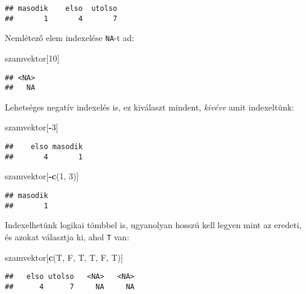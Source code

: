 \documentclass[]{book}
\newenvironment{Shaded}{\begin{snugshade}}{\end{snugshade}}
\newcommand{\DecValTok}[1]{\textcolor[rgb]{0.00,0.00,0.81}{#1}}
\newcommand{\KeywordTok}[1]{\textcolor[rgb]{0.13,0.29,0.53}{\textbf{#1}}}
\newcommand{\NormalTok}[1]{#1}
\newcommand{\OperatorTok}[1]{\textcolor[rgb]{0.81,0.36,0.00}{\textbf{#1}}}
\begin{document}
\begin{verbatim}
## masodik    elso  utolso 
##       1       4       7
\end{verbatim}

Nemlétező elem indexelése \texttt{NA}-t ad:

\begin{Shaded}
\begin{Highlighting}[]
\NormalTok{szamvektor[}\DecValTok{10}\NormalTok{]}
\end{Highlighting}
\end{Shaded}

\begin{verbatim}
## <NA> 
##   NA
\end{verbatim}

Lehetséges negatív indexelés is, ez kiválaszt mindent, \emph{kivéve} amit indexeltünk:

\begin{Shaded}
\begin{Highlighting}[]
\NormalTok{szamvektor[}\OperatorTok{-}\DecValTok{3}\NormalTok{]}
\end{Highlighting}
\end{Shaded}

\begin{verbatim}
##    elso masodik 
##       4       1
\end{verbatim}

\begin{Shaded}
\begin{Highlighting}[]
\NormalTok{szamvektor[}\OperatorTok{-}\KeywordTok{c}\NormalTok{(}\DecValTok{1}\NormalTok{, }\DecValTok{3}\NormalTok{)]}
\end{Highlighting}
\end{Shaded}

\begin{verbatim}
## masodik 
##       1
\end{verbatim}

Indexelhetünk logikai tömbbel is, ugyanolyan hosszú kell legyen mint az eredeti, és azokat választja ki, ahol \texttt{T} van:

\begin{Shaded}
\begin{Highlighting}[]
\NormalTok{szamvektor[}\KeywordTok{c}\NormalTok{(T, F, T, T, F, T)]}
\end{Highlighting}
\end{Shaded}

\begin{verbatim}
##   elso utolso   <NA>   <NA> 
##      4      7     NA     NA
\end{verbatim}
\end{document}

